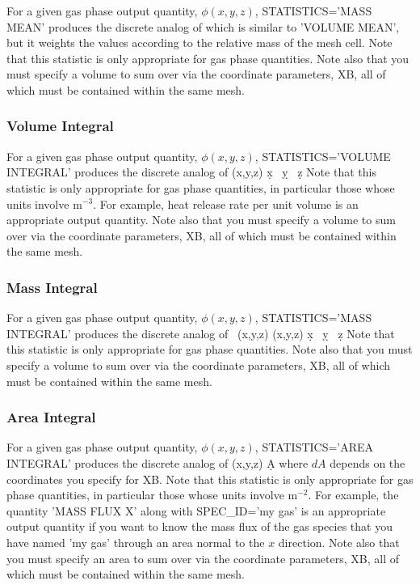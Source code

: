 \documentclass[11pt]{book}
\begin{document}
For a given gas phase output quantity, $\phi(x,y,z)$, {\ct STATISTICS='MASS MEAN'} produces the discrete analog of
\be {}  \ee
which is similar to {\ct 'VOLUME MEAN'}, but it weights the values according to the relative mass of the mesh cell. Note that this
statistic is only appropriate for gas phase quantities. Note also that you must specify a volume to sum over via the
coordinate parameters, {\ct XB}, all of which must be contained within the same mesh.

\subsubsection{Volume Integral}

For a given gas phase output quantity, $\phi(x,y,z)$, {\ct STATISTICS='VOLUME INTEGRAL'} produces the discrete analog of
\be \int \phi(x,y,z) \; \d x \, \d y \, \d z \ee
Note that this statistic is only appropriate for gas phase quantities, in particular those whose units involve m$^{-3}$. For example,
heat release rate per unit volume is an appropriate output quantity. Note also that you must specify a volume to sum over via the
coordinate parameters, {\ct XB}, all of which must be contained within the same mesh.

\subsubsection{Mass Integral}

For a given gas phase output quantity, $\phi(x,y,z)$, {\ct STATISTICS='MASS INTEGRAL'} produces the discrete analog of
\be \int \, \rho(x,y,z) \; \phi(x,y,z) \; \d x \, \d y \, \d z \ee
Note that this statistic is only appropriate for gas phase quantities. Note also that you must specify a volume to sum over via the
coordinate parameters, {\ct XB}, all of which must be contained within the same mesh.

\subsubsection{Area Integral}

For a given gas phase output quantity, $\phi(x,y,z)$, {\ct STATISTICS='AREA INTEGRAL'} produces the discrete analog of
\be \int \phi(x,y,z) \; \d A \ee
where $dA$ depends on the coordinates you specify for {\ct XB}.
Note that this statistic is only appropriate for gas phase quantities, in particular those whose units involve m$^{-2}$. For example,
the quantity {\ct 'MASS FLUX X'} along with {\ct SPEC\_ID='my gas'} is an appropriate output quantity if you want to know the mass flux of the gas species that
you have named {\ct 'my gas'} through an
area normal to the $x$ direction. Note also that you must specify an area to sum over via the
coordinate parameters, {\ct XB}, all of which must be contained within the same mesh.
\end{document}
